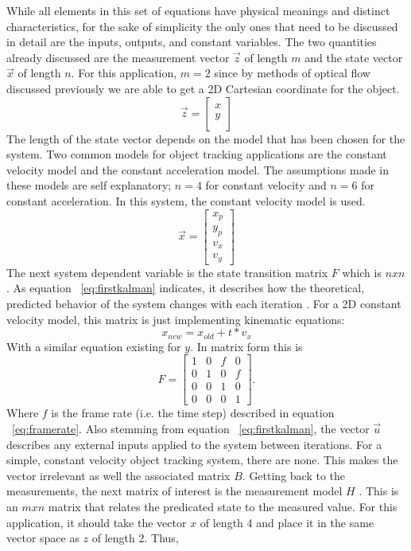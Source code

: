 \documentclass[11pt]{article} %
\begin{document}
While all elements in this set of equations have physical meanings and distinct characteristics, for the sake of simplicity the only ones that need to be discussed in detail are the inputs, outputs, and constant variables. The two quantities already discussed are the measurement vector $\vec{z}$ of length $m$ and the state vector $\vec{x}$ of length $n$. For this application, $m = 2$ since by methods of optical flow discussed previously we are able to get a 2D Cartesian coordinate for the object.
\begin{equation}
\vec{z} = \begin{bmatrix}
x \\
y \\
\end{bmatrix}
\end{equation}
The length of the state vector depends on the model that has been chosen for the system. Two common models for object tracking applications are the constant velocity model and the constant acceleration model. The assumptions made in these models are self explanatory; $n=4$ for constant velocity and $n=6$ for constant acceleration. In this system, the constant velocity model is used.
\begin{equation}
 \vec{x} = \begin{bmatrix}
x_p \\
y_p \\
v_x \\
v_y
\end{bmatrix}
\end{equation}
The next system dependent variable is the state transition matrix $F$ which is $nxn$. As equation ~\ref{eq:firstkalman} indicates, it describes how the theoretical, predicted behavior of the system changes with each iteration \cite{12}. For a 2D constant velocity model, this matrix is just implementing kinematic equations:
\begin{equation}
x_{new} = x_{old} + t * v_x
\end{equation}
With a similar equation existing for $y$. In matrix form this is 
\begin{equation}
F= \begin{bmatrix}
1 & 0 & f & 0 \\
0 & 1 & 0 & f \\
0 & 0 & 1 & 0 \\
0 & 0 & 0 & 1
\end{bmatrix}.
\end{equation}
Where $f$ is the frame rate (i.e. the time step) described in equation ~\ref{eq:framerate}. Also stemming from equation ~\ref{eq:firstkalman}, the vector $\vec{u}$ describes any external inputs applied to the system between iterations. For a simple, constant velocity object tracking system, there are none. This makes the vector irrelevant as well the associated matrix $B$. Getting back to the measurements, the next matrix of interest is the measurement model $H$ \cite{4}. This is an $mxn$ matrix that relates the predicated state to the measured value. For this application, it should take the vector $x$ of length 4 and place it in the same vector space as $z$ of length 2. Thus,
\end{document}
